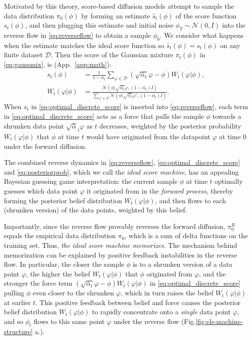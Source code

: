 \documentclass{article}
\theoremstyle{plain}
\theoremstyle{definition}
\theoremstyle{remark}
\begin{document}
Motivated by this theory, score-based diffusion models attempt to sample the data distribution $\pi_0(\phi)$ by forming an estimate $\hat s_t(\phi)$ of the score function $s_t(\phi)$, and then plugging this estimate and initial noise $\phi_T \sim \mathcal N(0,I)$ into the reverse flow in \eqref{eq:reverseflow} to obtain a sample $\phi_0$.  We consider what happens when the estimate matches the ideal score function so $\hat s_t(\phi)= s_t(\phi)$ on any finite dataset $\mathcal D$.  Then the score of the Gaussian mixture $\pi_t(\phi)$ in \eqref{eq:gaussmix}, is (App.~\ref{app:math}):
\begin{align}\label{eq:optimal_discrete_score}
    s_t(\phi) &= \frac{1}{1 - \bar{\alpha}_t}\sum_{\varphi \in \mathcal{D}} (\sqrt{\bar{\alpha}_t} \varphi - \phi) W_t(\varphi|\phi), \\
    \label{eq:posteriorprob}
    W_t(\varphi|\phi) &= \frac{\mathcal{N}(\phi| \sqrt{\bar{\alpha}_t} \varphi, (1 - \bar{\alpha}_t ) I)}{\sum_{\varphi' \in \mathcal{D}} \mathcal{N}(\phi| \sqrt{\bar{\alpha}_t} \varphi', (1 - \bar{\alpha}_t ) I)} .
\end{align}
When $s_t$ in \eqref{eq:optimal_discrete_score} 
is inserted into \eqref{eq:reverseflow}, 
each term in \eqref{eq:optimal_discrete_score} acts as a force 
that pulls the sample $\phi$ towards 
a shrunken data point $\sqrt{\bar{\alpha}}_t\varphi$ as $t$ decreases, 
weighted by the posterior probability $W_t(\varphi|\phi)$ that $\phi$ at time $t$ would have originated from the datapoint $\varphi$ at time $0$ under the forward diffusion. %

The combined reverse dynamics in \eqref{eq:reverseflow}, \eqref{eq:optimal_discrete_score} and \eqref{eq:posteriorprob}, which we call the {\it ideal score machine}, has an appealing Bayesian guessing game interpretation: the current sample $\phi$ at time $t$ optimally guesses which data point $\varphi$ it originated from in the {\it forward process}, thereby forming the posterior belief distribution $W_t(\varphi|\phi)$, and then flows to each (shrunken version) of the data points, weighted by this belief. 

Importantly, since the reverse flow provably reverses the forward diffusion, $\pi_0^R$ equals the empirical data distribution $\pi_0$, which is a sum of delta functions on the training set. Thus, \textit{the ideal score machine memorizes.} The mechanism behind memorization can be explained by positive feedback instabilities in the reverse flow.  In particular, the closer the sample $\phi$ is to a shrunken version of a data point $\varphi$, the higher the belief $W_t(\varphi|\phi)$ that $\phi$ originated from $\varphi$, and the stronger the force term  $(\sqrt{\bar{\alpha}_t} \varphi - \phi) W_t(\varphi|\phi)$ in \eqref{eq:optimal_discrete_score} pulling $\phi$ even closer to the shrunken $\varphi$, which in turn raises the belief $W_t(\varphi|\phi)$ at earlier $t$.  This positive feedback between belief and force causes the posterior belief distribution $W_t(\varphi|\phi)$ to rapidly concentrate onto a {\it single} data point $\varphi$, and so $\phi_t$ flows to this same point $\varphi$ under the reverse flow (Fig.\ref{fig:els-machine-structure} a.).  
\end{document}
